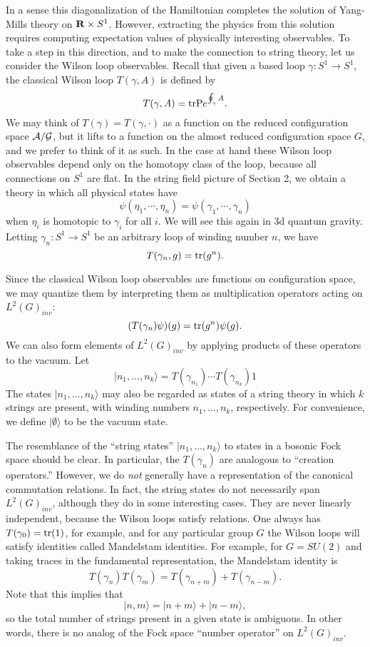 \documentclass[12pt]{article}
\newcommand{\maps}{\colon}
\newcommand{\A}{{\cal A}}
\newcommand{\G}{{\cal G}}
\newcommand{\R}{{\bf R}}
\newcommand{\tr}{{\rm tr}}
\begin{document}
In a sense this diagonalization of the Hamiltonian
completes the solution of Yang-Mills theory on $\R
\times S^1$.   However, extracting the physics from this solution requires
computing expectation values of physically interesting observables.
To take a step in this direction, and to make the connection to string
theory, let us consider the Wilson loop observables.   Recall that given a
based loop $\gamma \maps S^1 \to S^1$, the classical Wilson loop
$T(\gamma,A)$ is defined by
\[      T(\gamma,A) = \tr {\rm P} e^{ \oint_\gamma A } . \]
We may think of $T(\gamma) = T(\gamma, \cdot)$ as a
function on the reduced configuration space $\A/\G$,
but it lifts to a function
on the almost reduced configuration space $G$, and we prefer to think of
it as such.  In the case at hand these Wilson loop observables depend
only on the homotopy class of the loop, because all connections on $S^1$
are flat.  In the string field picture of Section 2, we obtain a
theory in which all physical states have
\[      \psi(\eta_1, \cdots, \eta_n) =  \psi(\gamma_1, \cdots,
\gamma_n)\]
when $\eta_i$ is homotopic to $\gamma_i$ for all $i$.
We will see this again in 3d quantum gravity.  Letting $\gamma_n \maps
S^1 \to S^1$ be an arbitrary loop of winding number $n$, we have
\[     T(\gamma_n, g) = \tr(g^n)  .\]

Since the classical Wilson loop observables are functions on
configuration space, we may quantize them by interpreting them
as multiplication operators acting on $L^2(G)_{inv}$:
\[       (T(\gamma_n)\psi)(g) = \tr(g^n)\psi(g)  .\]
We can also form elements of $L^2(G)_{inv}$ by applying products of
these operators to the vacuum.  Let
\[     | n_1, \dots, n_k \rangle =  T(\gamma_{n_1}) \cdots T(\gamma_{n_k}) 1 \]
The states
$  | n_1, \dots, n_k \rangle$ may also be regarded as states of a string
theory in
which $k$ strings are present, with winding numbers $n_1, \dots, n_k$,
respectively.    For convenience, we define
$|\emptyset\rangle$ to be the vacuum
state.

The resemblance of the ``string states'' $|n_1, \dots, n_k\rangle$
to states in a bosonic Fock space should be clear.
In particular, the $T(\gamma_n)$ are analogous to ``creation
operators.''  However, we do {\it not} generally have a representation
of the canonical commutation relations.  In fact, the string states
do not necessarily span $L^2(G)_{inv}$, although they do in some
interesting cases.  They are never linearly independent, because
the Wilson loops satisfy relations.  One always has
$T(\gamma_0) = \tr(1)$, for example,
and for any particular group $G$ the Wilson loops will satisfy
identities called Mandelstam identities.
For example, for $G = SU(2)$ and taking traces in the fundamental
representation, the Mandelstam identity is
\[        T(\gamma_n)T(\gamma_m) = T(\gamma_{n+m}) + T(\gamma_{n-m}).\]
Note that this implies that
\[      |n,m\rangle = |n+m\rangle + |n-m\rangle, \]
so the total number of strings present in a given state is ambiguous.
In other words, there is no analog of the Fock space ``number
operator'' on $L^2(G)_{inv}$.
\end{document}
